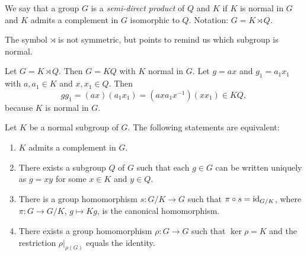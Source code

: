 \begin{definition}
We say that a group $G$ is a \emph{semi-direct product} of $Q$ and $K$ if $K$ 
is normal in $G$ and 
$K$ admits a complement in $G$ isomorphic to $Q$. Notation: $G=K\rtimes Q$.
\end{definition}

The symbol $\rtimes$ is not symmetric, but points to remind us which subgroup is normal. 

Let $G=K\rtimes Q$. Then $G=KQ$ with $K$ normal in $G$. 
Let $g=ax$ and $g_1=a_1x_1$ with $a,a_1\in K$ and $x,x_1\in Q$. 
Then 
\[
gg_1=(ax)(a_1x_1)=(axa_1x^{-1})(xx_1)\in KQ,
\]
because $K$ is normal in $G$. 

\begin{theorem}
Let $K$ be a normal subgroup of $G$. The following statements are equivalent:
\begin{enumerate}
\item $K$ admits a complement in $G$.
\item There exists a subgroup $Q$ of $G$ such that each $g\in G$ can be written uniquely 
as $g=xy$ for some 
$x\in K$ and $y\in Q$.
\item There is a group homomorphism $s\colon G/K\to G$ such that $\pi\circ s=\operatorname{id}_{G/K}$, where $\pi\colon G\to G/K
$, $g\mapsto Kg$, is the canonical homomorphism.
\item There exists a group homomorphism $\rho\colon G\to G$ such that $\ker\rho=K$ and the restriction $\rho|_{\rho(G)}$ equals the identity. 
\end{enumerate}
\end{theorem}

